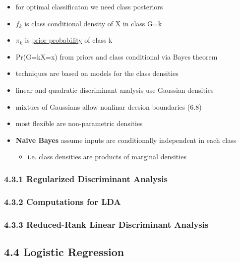 \documentclass[11pt]{article}
\providecommand{\tightlist}{%
      \setlength{\itemsep}{0pt}\setlength{\parskip}{0pt}}
\begin{document}
\begin{itemize}
\tightlist
\item
  for optimal classificaton we need class posteriors
\item
  \(f_{k}\) is class conditional density of X in class G=k
\item
  \(\pi_{k}\) is
  \href{https://en.wikipedia.org/wiki/Prior_probability}{prior
  probability} of class k
\item
  Pr(G=k\textbar{}X=x) from priors and class conditional via Bayes
  theorem
\item
  techniques are based on models for the class densities
\item
  linear and quadratic discriminant analysis use Gaussian densities
\item
  mixtues of Gaussians allow nonlinar decsion boundaries (6.8)
\item
  most flexible are non-parametric densities
\item
  \textbf{Naive Bayes} assume inputs are conditionally independent in
  each class

  \begin{itemize}
  \tightlist
  \item
    i.e. class densities are products of marginal densities
  \end{itemize}
\end{itemize}

\subsubsection{4.3.1 Regularized Discriminant
Analysis}\label{regularized-discriminant-analysis}

\subsubsection{4.3.2 Computations for LDA}\label{computations-for-lda}

\subsubsection{4.3.3 Reduced-Rank Linear Discriminant
Analysis}\label{reduced-rank-linear-discriminant-analysis}

\subsection{4.4 Logistic Regression}\label{logistic-regression}
\end{document}
